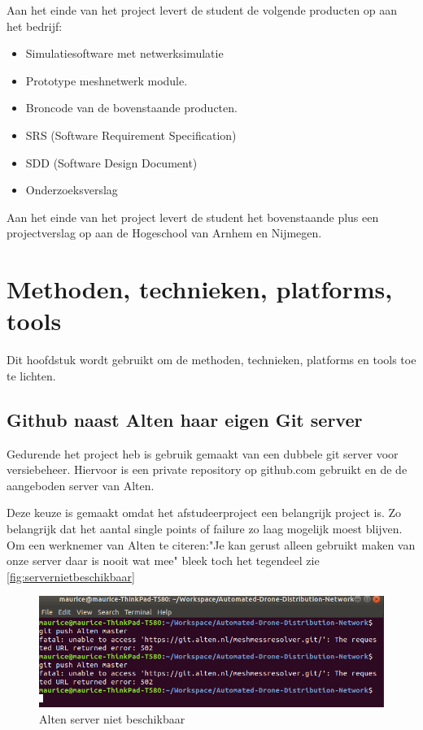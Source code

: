 \documentclass[a4paper, 11pt, oneside]{report}
\begin{document}
Aan het einde van het project levert de student de volgende producten op aan het bedrijf:

\begin{itemize}
	\item Simulatiesoftware met netwerksimulatie
	\item Prototype meshnetwerk module.
	\item Broncode van de bovenstaande producten. 
	\item SRS (Software Requirement Specification)
	\item SDD (Software Design Document)
	\item Onderzoeksverslag
\end{itemize}

Aan het einde van het project levert de student het bovenstaande plus een projectverslag op aan de Hogeschool van Arnhem en Nijmegen.


\chapter{Methoden, technieken, platforms, tools}\label{sec:methoden-technieken-platforms-tools}
Dit hoofdstuk wordt gebruikt om de methoden, technieken, platforms en tools toe te lichten.

\section{Github naast Alten haar eigen Git server}

Gedurende het project heb is gebruik gemaakt van een dubbele git server voor versiebeheer.
Hiervoor is een private repository op github.com gebruikt en de de aangeboden server van Alten.

Deze keuze is gemaakt omdat het afstudeerproject een belangrijk project is. 
Zo belangrijk dat het aantal single points of failure zo laag mogelijk moest blijven.
Om een werknemer van Alten te citeren:"Je kan gerust alleen gebruikt maken van onze server daar is nooit wat mee" bleek toch het tegendeel zie \autoref{fig:servernietbeschikbaar}

\begin{figure}[H]
	\begin{center}\includegraphics[width=0.61\linewidth]{Afbeeldingen/AltenGit.png}\end{center}
	\caption{Alten server niet beschikbaar}
	\label{fig:servernietbeschikbaar}
\end{figure}
\end{document}
